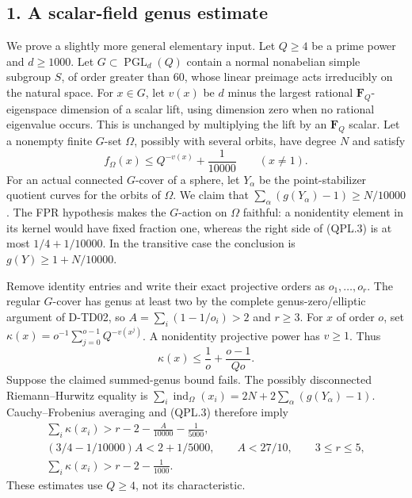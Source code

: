 \subsection*{1. A scalar-field genus estimate}

We prove a slightly more general elementary input. Let \(Q\ge4\)
be a prime power and \(d\ge1000\). Let
\(G\subset\operatorname{PGL}_d(Q)\) contain a normal nonabelian
simple subgroup \(S\), of order greater than 60, whose linear
preimage acts irreducibly on the natural space.
For \(x\in G\), let \(v(x)\) be \(d\) minus the largest rational
\(\mathbf F_Q\)-eigenspace dimension of a scalar lift, using
dimension zero when no rational eigenvalue occurs.
This is unchanged by multiplying the lift by an \(\mathbf F_Q\)
scalar. Let a nonempty finite \(G\)-set \(\Omega\), possibly
with several orbits, have degree \(N\) and satisfy
\[
       f_\Omega(x)\le Q^{-v(x)}+\frac1{10000}
                     \qquad(x\ne1).
 \tag{QPL.3}
\]
For an actual connected \(G\)-cover of a sphere, let \(Y_\alpha\)
be the point-stabilizer quotient curves for the orbits of \(\Omega\).
We claim that \(\sum_\alpha(g(Y_\alpha)-1)\ge N/10000\).
The FPR hypothesis makes the \(G\)-action on \(\Omega\) faithful:
a nonidentity element in its kernel would have fixed fraction one,
whereas the right side of (QPL.3) is at most \(1/4+1/10000\).
In the transitive case the conclusion is \(g(Y)\ge1+N/10000\).

Remove identity entries and write their exact projective orders
as \(o_1,\ldots,o_r\). The regular \(G\)-cover has genus at least
two by the complete genus-zero/elliptic argument of D-TD02,
so \(A=\sum_i(1-1/o_i)>2\) and \(r\ge3\).
For \(x\) of order \(o\), set
\(\kappa(x)=o^{-1}\sum_{j=0}^{o-1}Q^{-v(x^j)}\).
A nonidentity projective power has \(v\ge1\). Thus
\[
 \kappa(x)\le\frac1o+\frac{o-1}{Qo}.
 \tag{QPL.4}
\]
Suppose the claimed summed-genus bound fails. The possibly
disconnected Riemann--Hurwitz equality is
\(\sum_i\operatorname{ind}_\Omega(x_i)
=2N+2\sum_\alpha(g(Y_\alpha)-1)\).
Cauchy--Frobenius averaging and (QPL.3) therefore imply
\[
 \begin{gathered}
 \sum_i\kappa(x_i)>r-2-\frac{A}{10000}-\frac1{5000},\\
 (3/4-1/10000)A<2+1/5000,\qquad
 A<27/10,\qquad 3\le r\le5,\\
                  \sum_i\kappa(x_i)>r-2-\frac1{1000}.
 \end{gathered}
 \tag{QPL.5}
\]
These estimates use \(Q\ge4\), not its characteristic.

